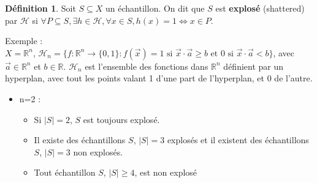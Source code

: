 \documentclass{article}
\theoremstyle{plain}
\theoremstyle{remark}
\theoremstyle{definition}
\newtheorem{defin}[thrm]{Définition}
\begin{document}
\begin{defin}
    Soit $S\subseteq X$ un échantillon. On dit que $S$ est \textbf{explosé} (shattered) par $\mathcal{H}$ si $\forall P \subseteq S, \exists h \in \mathcal{H}, \forall x \in S, h(x)=1 \Leftrightarrow x \in P$.
\end{defin}

Exemple : \\
$X=\mathbb{R}^n$, $\mathcal{H}_n = \{f : \mathbb{R}^n \rightarrow \{0,1\} : f(\overrightarrow{x})= 1 \text{ si } \overrightarrow{x} \cdot \overrightarrow{a} \geq b \text{ et 0 si } \overrightarrow{x} \cdot \overrightarrow{a} < b \}$, avec $\overrightarrow{a}\in \mathbb{R}^n$ et $b\in \mathbb{R}$. $\mathcal{H}_n$ est l'ensemble des fonctions dans $\mathbb{R}^n$ définient par un hyperplan, avec tout les points valant 1 d'une part de l'hyperplan, et 0 de l'autre.

\begin{itemize}
    \item n=2 : 
    \begin{itemize}
        \item Si $|S|=2$, $S$ est toujours explosé.        
        \item Il existe des échantillons $S$, $|S|=3$ explosés et il existent des échantillons $S$, $|S|=3$ non explosés.
        \item Tout échantillon $S$, $|S|\geq 4$, est non explosé
    \end{itemize}
\end{itemize}
        
\end{document}
